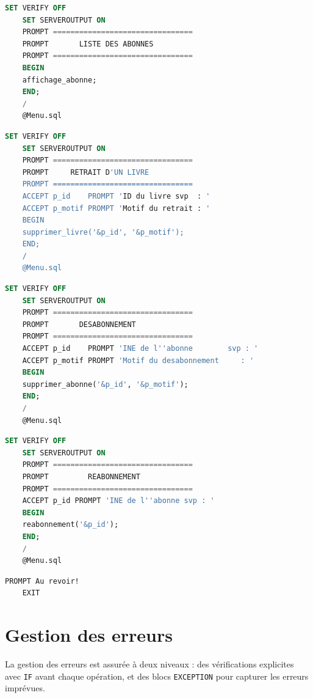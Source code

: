 \documentclass[12pt, a4paper]{report}
\begin{document}
\begin{lstlisting}[language=SQL, caption=affichage\_abonne.sql]
	SET VERIFY OFF
	SET SERVEROUTPUT ON
	PROMPT ================================
	PROMPT       LISTE DES ABONNES
	PROMPT ================================
	BEGIN
	affichage_abonne;
	END;
	/
	@Menu.sql
\end{lstlisting}

\begin{lstlisting}[language=SQL, caption=supprimer\_livre.sql]
	SET VERIFY OFF
	SET SERVEROUTPUT ON
	PROMPT ================================
	PROMPT     RETRAIT D'UN LIVRE
	PROMPT ================================
	ACCEPT p_id    PROMPT 'ID du livre svp  : '
	ACCEPT p_motif PROMPT 'Motif du retrait : '
	BEGIN
	supprimer_livre('&p_id', '&p_motif');
	END;
	/
	@Menu.sql
\end{lstlisting}

\begin{lstlisting}[language=SQL, caption=desabonne.sql]
	SET VERIFY OFF
	SET SERVEROUTPUT ON
	PROMPT ================================
	PROMPT       DESABONNEMENT
	PROMPT ================================
	ACCEPT p_id    PROMPT 'INE de l''abonne        svp : '
	ACCEPT p_motif PROMPT 'Motif du desabonnement     : '
	BEGIN
	supprimer_abonne('&p_id', '&p_motif');
	END;
	/
	@Menu.sql
\end{lstlisting}

\begin{lstlisting}[language=SQL, caption=reabonnement.sql]
	SET VERIFY OFF
	SET SERVEROUTPUT ON
	PROMPT ================================
	PROMPT         REABONNEMENT
	PROMPT ================================
	ACCEPT p_id PROMPT 'INE de l''abonne svp : '
	BEGIN
	reabonnement('&p_id');
	END;
	/
	@Menu.sql
\end{lstlisting}

\begin{lstlisting}[language=SQL, caption=quitter.sql]
	PROMPT Au revoir!
	EXIT
\end{lstlisting}

\chapter{Gestion des erreurs}

La gestion des erreurs est assurée à deux niveaux : des vérifications
explicites avec \texttt{IF} avant chaque opération, et des blocs
\texttt{EXCEPTION} pour capturer les erreurs imprévues.
\end{document}
